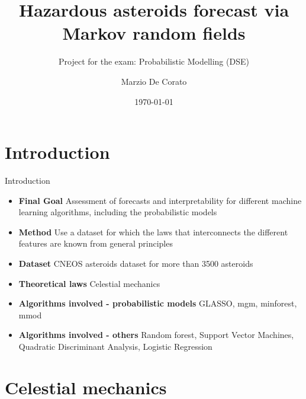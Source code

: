 \documentclass{beamer}
\title[Hazardous asteroids forecast via Markov random fields]{Hazardous asteroids forecast via Markov random fields}
\subtitle{Project for the exam: Probabilistic Modelling (DSE)}
\author{Marzio De Corato}
\date{\today}
\begin{document}
\begin{frame}
\vspace{+4 cm}  \titlepage
\end{frame}

\usebackgroundtemplate{ } 


\section{Introduction}

\begin{frame}{Introduction}

\begin{itemize}
\item \textbf{Final Goal} Assessment of forecasts and interpretability for different machine learning algorithms, including the probabilistic models
\item \textbf{Method} Use a dataset for which the laws that interconnects the different features are known from general principles
\item \textbf{Dataset} CNEOS asteroids dataset for more than 3500 asteroids
\item \textbf{Theoretical laws} Celestial mechanics
\item \textbf{Algorithms involved - probabilistic models} GLASSO, mgm, minforest, mmod
\item \textbf{Algorithms involved - others} Random forest, Support Vector Machines, Quadratic Discriminant Analysis, Logistic Regression  

\end{itemize} 

\end{frame}

\section{Celestial mechanics}
\end{document}
